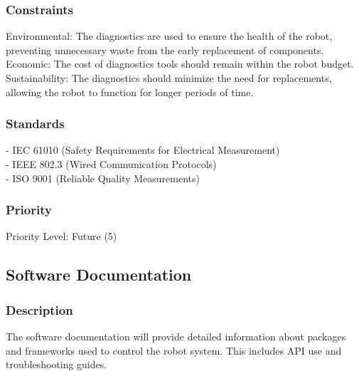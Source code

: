 \subsubsection{Constraints}
Environmental: The diagnostics are used to ensure the health of the robot, preventing unnecessary waste from the early replacement of components.\\
Economic: The cost of diagnostics tools should remain within the robot budget.\\
Sustainability: The diagnostics should minimize the need for replacements, allowing the robot to function for longer periods of time.

\subsubsection{Standards}
- IEC 61010 (Safety Requirements for Electrical Measurement)\\
- IEEE 802.3 (Wired Communication Protocols)\\
- ISO 9001 (Reliable Quality Measurements)

\subsubsection{Priority}
Priority Level: Future (5)



\subsection{Software Documentation}
\subsubsection{Description}
The software documentation will provide detailed information about packages and frameworks used to control the robot system. This includes API use and troubleshooting guides. 

